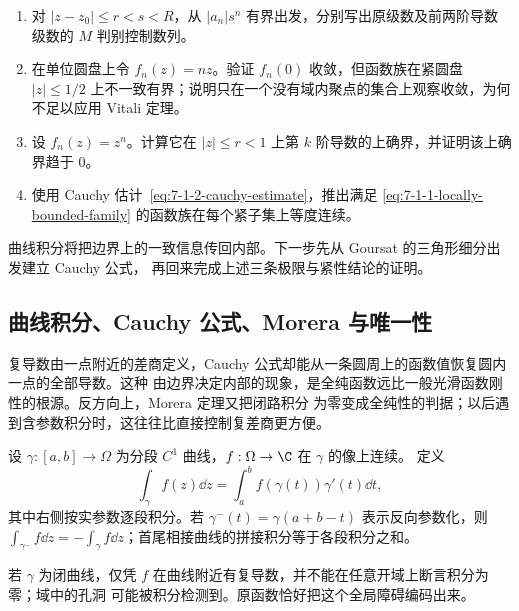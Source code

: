 \begin{exercise}
\begin{enumerate}
  \item 对 $|z-z_0|\le r<s<R$，从 $|a_n|s^n$ 有界出发，分别写出原级数及前两阶导数级数的
        $M$ 判别控制数列。
  \item 在单位圆盘上令 $f_n(z)=nz$。验证 $f_n(0)$ 收敛，但函数族在紧圆盘
        $|z|\le1/2$ 上不一致有界；说明只在一个没有域内聚点的集合上观察收敛，为何不足以应用
        Vitali 定理。
  \item 设 $f_n(z)=z^n$。计算它在 $|z|\le r<1$ 上第 $k$ 阶导数的上确界，并证明该上确界趋于
        $0$。
  \item 使用 Cauchy 估计~\eqref{eq:7-1-2-cauchy-estimate}，推出满足
        \eqref{eq:7-1-1-locally-bounded-family} 的函数族在每个紧子集上等度连续。
\end{enumerate}
\end{exercise}

曲线积分将把边界上的一致信息传回内部。下一步先从 Goursat 的三角形细分出发建立 Cauchy 公式，
再回来完成上述三条极限与紧性结论的证明。


\subsection{曲线积分、Cauchy 公式、Morera 与唯一性}\label{subsec:7-1-2}

复导数由一点附近的差商定义，Cauchy 公式却能从一条圆周上的函数值恢复圆内一点的全部导数。这种
由边界决定内部的现象，是全纯函数远比一般光滑函数刚性的根源。反方向上，Morera 定理又把闭路积分
为零变成全纯性的判据；以后遇到含参数积分时，这往往比直接控制复差商更方便。

\begin{definition}[复曲线积分]\label{def:7-1-2-1}
设 $\gamma:[a,b]\to\Omega$ 为分段 $C^1$ 曲线，$f:\Omega\to\C$ 在 $\gamma$ 的像上连续。
定义
\[
  \int_\gamma f(z)\dd z
  =\int_a^b f(\gamma(t))\gamma'(t)\dd t,
  \tag{7.1.3}\label{eq:7-1-2-curve-integral}
\]
其中右侧按实参数逐段积分。若 $\gamma^{-}(t)=\gamma(a+b-t)$ 表示反向参数化，则
$\int_{\gamma^-}f\dd z=-\int_\gamma f\dd z$；首尾相接曲线的拼接积分等于各段积分之和。
\end{definition}

若 $\gamma$ 为闭曲线，仅凭 $f$ 在曲线附近有复导数，并不能在任意开域上断言积分为零；域中的孔洞
可能被积分检测到。原函数恰好把这个全局障碍编码出来。

